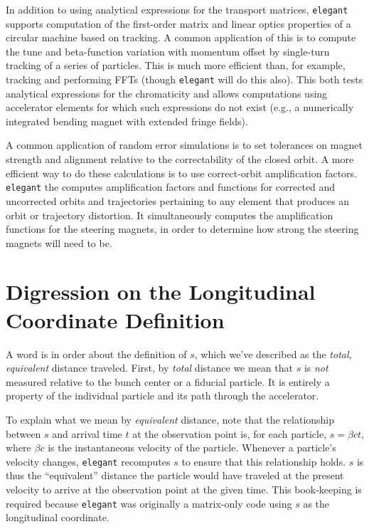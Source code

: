 \documentclass[11pt]{article}
\begin{document}
In addition to using analytical expressions for the transport
matrices, {\tt elegant} supports computation of the first-order matrix
and linear optics properties of a circular machine based on tracking.
A common application of this is to compute the tune and beta-function
variation with momentum offset by single-turn tracking of a series of
particles.  This is much more efficient than, for example, tracking
and performing FFTs (though {\tt elegant} will do this also).  This
both tests analytical expressions for the chromaticity and allows
computations using accelerator elements for which such expressions do
not exist (e.g., a numerically integrated bending magnet with extended
fringe fields).

A common application of random error simulations is to set tolerances
on magnet strength and alignment relative to the correctability of the
closed orbit.  A more efficient way to do these calculations is to use
correct-orbit amplification factors\cite{Borland_PC}.  {\tt elegant}
the computes amplification factors and functions for corrected and
uncorrected orbits and trajectories pertaining to any element that
produces an orbit or trajectory distortion.  It simultaneously
computes the amplification functions for the steering magnets, in
order to determine how strong the steering magnets will need to be.

\section{Digression on the Longitudinal Coordinate Definition\label{sec:longitCoord}}

A word is in order about the definition of $s$, which we've described
as the {\em total, equivalent} distance traveled.  First, by {\em
total} distance we mean that $s$ is {\em not} measured relative to the
bunch center or a fiducial particle.  It is entirely a property of the
individual particle and its path through the accelerator.

To explain what we mean by {\em equivalent} distance, note that the
relationship between $s$ and arrival time $t$ at the observation point
is, for each particle, $s = \beta c t$, where $\beta c$ is the
instantaneous velocity of the particle.  Whenever a particle's
velocity changes, {\tt elegant} recomputes $s$ to ensure that this
relationship holds.  $s$ is thus the ``equivalent'' distance the
particle would have traveled at the present velocity to arrive at the
observation point at the given time.  This book-keeping is required
because {\tt elegant} was originally a matrix-only code using $s$ as
the longitudinal coordinate.
\end{document}
